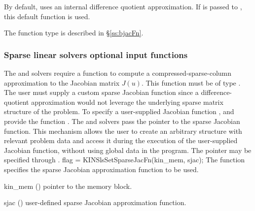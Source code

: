 {
  By default, {\kinband} uses an internal difference quotient approximation.
  If  is passed to , this default function is used.

  The function type  is described in \S\ref{ss:bjacFn}.
}

\subsubsection{Sparse linear solvers optional input functions}\label{sss:optin_sls}
The 
{\kinklu} and {\kinsuperlumt} solvers require a function to compute a
compressed-sparse-column approximation to the Jacobian matrix $J(u)$.
This function must be of type .  The user must
supply a custom sparse Jacobian function since a difference-quotient
approximation would not leverage the underlying sparse matrix
structure of the problem.  To specify a user-supplied Jacobian
function , {\kinklu} and {\kinsuperlumt} provide the function
. The {\kinklu} and {\kinsuperlumt} solvers
pass the pointer  to the sparse Jacobian
function. This mechanism allows the user to create an arbitrary structure with
relevant problem data and access it during the execution of the
user-supplied Jacobian function, without using global data in the
program.  The pointer  may be specified through
.
{
  flag = KINSlsSetSparseJacFn(kin\_mem, sjac);
}
{
  The function  specifies the sparse Jacobian
  approximation function to be used.
}
{
  \begin{args}
  \item[kin\_mem] ()
    pointer to the {\kinsol} memory block.
  \item[sjac] ()
    user-defined sparse Jacobian approximation function.
  \end{args}
}
